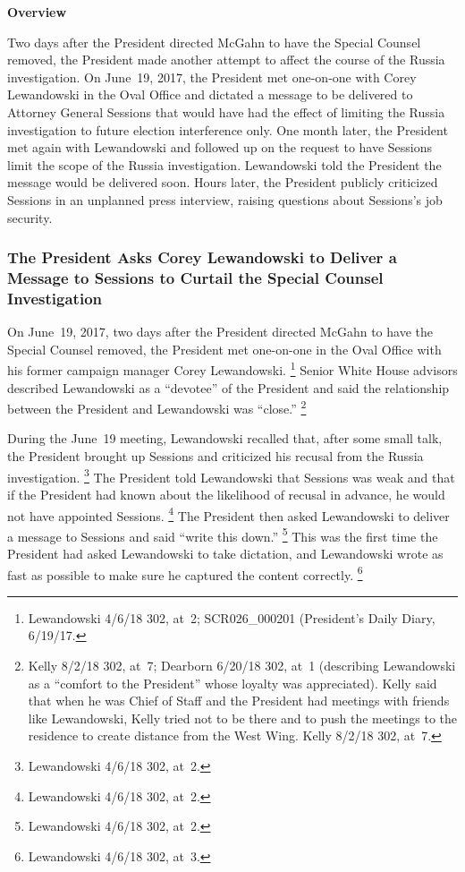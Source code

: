 \begin{center}
\textbf{Overview}
\end{center}

Two days after the President directed McGahn to have the Special Counsel removed, the President made another attempt to affect the course of the Russia investigation.
On June~19, 2017, the President met one-on-one with Corey Lewandowski in the Oval Office and dictated a message to be delivered to Attorney General Sessions that would have had the effect of limiting the Russia investigation to future election interference only.
One month later, the President met again with Lewandowski and followed up on the request to have Sessions limit the scope of the Russia investigation.
Lewandowski told the President the message would be delivered soon.
Hours later, the President publicly criticized Sessions in an unplanned press interview, raising questions about Sessions's job security.

\subsubsection{The President Asks Corey Lewandowski to Deliver a Message to Sessions to Curtail the Special Counsel Investigation}

On June~19, 2017, two days after the President directed McGahn to have the Special Counsel removed, the President met one-on-one in the Oval Office with his former campaign manager Corey Lewandowski.%
\footnote{Lewandowski 4/6/18 302, at~2;
SCR026\_000201 (President's Daily Diary, 6/19/17.
}
Senior White House advisors described Lewandowski as a ``devotee'' of the President and said the relationship between the President and Lewandowski was ``close.''%
\footnote{Kelly 8/2/18 302, at~7;
Dearborn 6/20/18 302, at~1 (describing Lewandowski as a ``comfort to the President'' whose loyalty was appreciated).
Kelly said that when he was Chief of Staff and the President had meetings with friends like Lewandowski, Kelly tried not to be there and to push the meetings to the residence to create distance from the West Wing.
Kelly 8/2/18 302, at~7.}

During the June~19 meeting, Lewandowski recalled that, after some small talk, the President brought up Sessions and criticized his recusal from the Russia investigation.%
\footnote{Lewandowski 4/6/18 302, at~2.}
The President told Lewandowski that Sessions was weak and that if the President had known about the likelihood of recusal in advance, he would not have appointed Sessions.%
\footnote{Lewandowski 4/6/18 302, at~2.}
The President then asked Lewandowski to deliver a message to Sessions and said ``write this down.''%
\footnote{Lewandowski 4/6/18 302, at~2.}
This was the first time the President had asked Lewandowski to take dictation, and Lewandowski wrote as fast as possible to make sure he captured the content correctly.%
\footnote{Lewandowski 4/6/18 302, at~3.}

